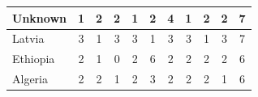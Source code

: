 \documentclass[12pt]{article}  %
\begin{document}
\begin{subappendices}
\begin{longtable}{|l|c|c|c|c|c|c|c|c|c|c|}
	\hline
	Unknown                                                        & 1                                                                      & 2                                                                      & 2                                                                      & 1                                                                      & 2                                                                      & 4                                                                      & 1                         & 2                           & 2                           & 7                           \\ 
	\hline
	Latvia                                                         & 3                                                                      & 1                                                                      & 3                                                                      & 3                                                                      & 1                                                                      & 3                                                                      & 3                         & 1                           & 3                           & 7                           \\ 
	\hline
	Ethiopia                                                       & 2                                                                      & 1                                                                      & 0                                                                      & 2                                                                      & 6                                                                      & 2                                                                      & 2                         & 2                           & 2                           & 6                           \\ 
	\hline
	Algeria                                                        & 2                                                                      & 2                                                                      & 1                                                                      & 2                                                                      & 3                                                                      & 2                                                                      & 2                         & 2                           & 1                           & 6                           \\ 

\end{longtable}
\end{subappendices}
\end{document}

